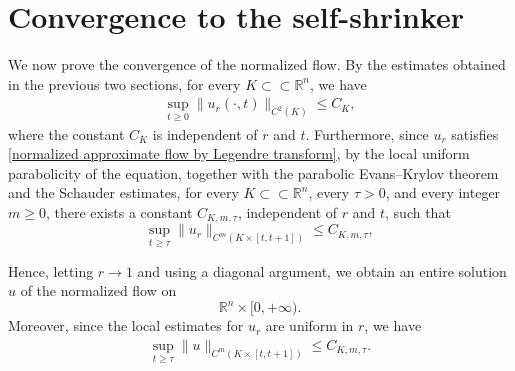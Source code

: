 \documentclass[reqno]{amsart}
\theoremstyle{remark}
\theoremstyle{definition}
\numberwithin{equation}{section}
\begin{document}


\section{Convergence to the self-shrinker}

We now prove the convergence of the normalized flow. By the estimates obtained in the previous two sections, for every $K \subset \subset \mathbb R^n$, we have 
\begin{align}
    \sup_{t \geqslant 0}\|u_r(\cdot, t)\|_{C^2(K)}
    \leqslant C_{K},
\end{align}
where the constant $C_{K}$ is independent of $r$ and $t$. 
Furthermore, since $u_r$ satisfies \eqref{normalized approximate flow by Legendre transform}, by the local uniform parabolicity of the equation, together with the parabolic Evans--Krylov theorem and the Schauder estimates, for every $K \subset \subset \mathbb{R}^n$, every $\tau>0$, and every integer $m \geqslant 0$, there exists a constant $C_{K,m,\tau}$, independent of $r$ and $t$, such that
\[ 
\sup_{t \geqslant \tau}\|u_r\|_{C^m(K\times[t,t+1])}
\leqslant C_{K,m,\tau},
\]

Hence, letting $r \to 1$ and using a diagonal argument, we obtain an entire solution
$u$ of the normalized flow on
\[
\mathbb R^n\times[0,+\infty).
\]
Moreover, since the local estimates for $u_r$ are uniform in $r$, we have
\begin{align}\label{local estimates for u}
    \sup_{t \geqslant \tau}\|u\|_{C^m(K\times[t,t+1])}
    \leqslant C_{K,m,\tau}.
\end{align}
\end{document}
